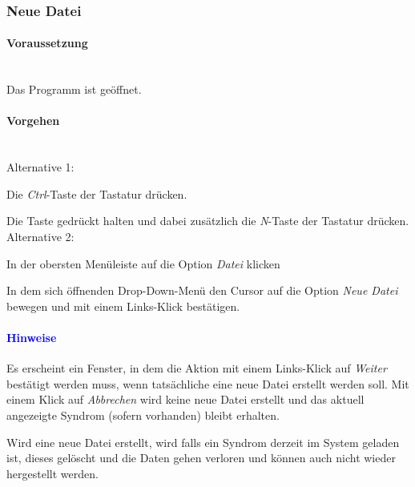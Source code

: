 \documentclass[enabledeprecatedfontcommands,fontsize=11pt,paper=a4,twoside]{scrartcl}
\newcounter{one}
\newcounter{two}[one]
\newcommand*{\hint}{\paragraph{\textcolor{blue}{Hinweise}}}
\newcommand*{\condition}{\paragraph{Voraussetzung}$\;$ \vspace{0.2cm}\\}
\newcommand*{\actions}{\paragraph{Vorgehen} $\;$\vspace{0.2cm}\\}
\newcommand*{\aOne}{\textcolor{bbe}{Alternative 1:}}
\newcommand*{\aTwo}{\textcolor{bbe}{Alternative 2:}}
\let\tempone\itemize
\let\temptwo\enditemize
\renewenvironment{itemize}{\tempone\addtolength{\itemsep}{-10.0pt}}{\temptwo}
\let\origenumerate\enumerate
\let\origendenumerate\endenumerate
\renewenvironment{enumerate}{\origenumerate \addtolength{\itemsep}{-10.0pt}}{\origendenumerate}
\begin{document}
\subsubsection{Neue Datei}
		\condition 	
		Das Programm ist geöffnet.
		\actions
		\aOne
		\begin{enumerate}
				\item Die \textit{Ctrl}-Taste der Tastatur drücken.
				\item Die Taste gedrückt halten und dabei zusätzlich die \textit{N}-Taste der Tastatur drücken.
		\end{enumerate}				
		\aTwo
		\begin{enumerate}
				\item In der obersten Menüleiste auf die Option \textit{Datei} klicken 
				\item In dem sich öffnenden Drop-Down-Menü den Cursor auf die Option \textit{Neue Datei} bewegen und mit einem Links-Klick bestätigen.
		\end{enumerate}		
		\hint
		\begin{itemize}
				\item Es erscheint ein Fenster, in dem die Aktion mit einem Links-Klick auf \textit{Weiter} bestätigt werden muss, wenn tatsächliche eine neue Datei erstellt werden soll. Mit einem Klick auf \textit{Abbrechen} wird keine neue Datei erstellt und das aktuell angezeigte Syndrom (sofern vorhanden) bleibt erhalten.
				\item Wird eine neue Datei erstellt, wird falls ein Syndrom derzeit im System geladen ist, dieses gelöscht und die Daten gehen verloren und können auch nicht wieder hergestellt werden. \\
		\end{itemize}
		
						
\end{document}
